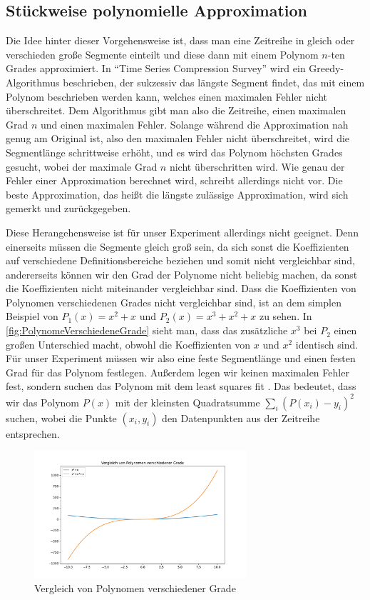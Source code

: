 \subsection{Stückweise polynomielle Approximation}\label{subsec:ppa}
Die Idee hinter dieser Vorgehensweise ist, dass man eine Zeitreihe in gleich oder verschieden große Segmente einteilt und diese dann mit einem Polynom $n$-ten Grades approximiert. In "`Time Series Compression Survey"' \cite[Ch. 4.2.1]{compressionSurvey} wird ein Greedy-Algorithmus beschrieben, der sukzessiv das längste Segment findet, das mit einem Polynom beschrieben werden kann, welches einen maximalen Fehler nicht überschreitet. Dem Algorithmus gibt man also die Zeitreihe, einen maximalen Grad $n$ und einen maximalen Fehler. Solange während die Approximation nah genug am Original ist, also den maximalen Fehler nicht überschreitet, wird die Segmentlänge schrittweise erhöht, und es wird das Polynom höchsten Grades gesucht, wobei der maximale Grad $n$ nicht überschritten wird. Wie genau der Fehler einer Approximation berechnet wird, schreibt \cite[Algorithm 4]{compressionSurvey} allerdings nicht vor. Die beste Approximation, das heißt die längste zulässige Approximation, wird sich gemerkt und zurückgegeben.

Diese Herangehensweise ist für unser Experiment allerdings nicht geeignet. Denn einerseits müssen die Segmente gleich groß sein, da sich sonst die Koeffizienten auf verschiedene Definitionsbereiche beziehen und somit nicht vergleichbar sind, andererseits können wir den Grad der Polynome nicht beliebig machen, da sonst die Koeffizienten nicht miteinander vergleichbar sind. Dass die Koeffizienten von Polynomen verschiedenen Grades nicht vergleichbar sind, ist an dem simplen Beispiel von $P_1(x)=x^2+x$ und $P_2(x)=x^3+x^2+x$ zu sehen. In \autoref{fig:PolynomeVerschiedeneGrade} sieht man, dass das zusätzliche $x^3$ bei $P_2$ einen großen Unterschied macht, obwohl die Koeffizienten von $x$ und $x^2$ identisch sind. Für unser Experiment müssen wir also eine feste Segmentlänge und einen festen Grad für das Polynom festlegen. Außerdem legen wir keinen maximalen Fehler fest, sondern suchen das Polynom mit dem least squares fit \cite{leastSquares}. Das bedeutet, dass wir das Polynom $P(x)$ mit der kleinsten Quadratsumme $\sum_i (P(x_i)-y_i)^2$ suchen, wobei die Punkte $(x_i,y_i)$ den Datenpunkten aus der Zeitreihe entsprechen.
\begin{figure}[bth] 
  \centering
  \includegraphics[width=0.7\textwidth]{Graphics/ComparissonDifferentPolDegrees.pdf}
  \caption{Vergleich von Polynomen verschiedener Grade}
  \label{fig:PolynomeVerschiedeneGrade}
\end{figure}

